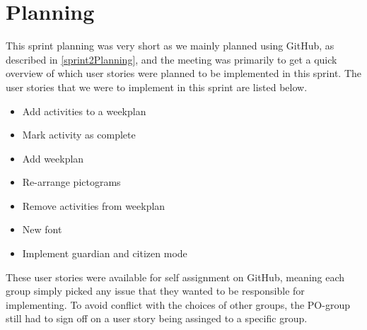 \section{Planning}
This sprint planning was very short as we mainly planned using GitHub, as described in \autoref{sprint2Planning}, and the meeting was primarily to get a quick overview of which user stories were planned to be implemented in this sprint.
The user stories that we were to implement in this sprint are listed below.

\begin{itemize}
\item Add activities to a weekplan
\item Mark activity as complete
\item Add weekplan
\item Re-arrange pictograms
\item Remove activities from weekplan
\item New font
\item Implement guardian and citizen mode
\end{itemize}

These user stories were available for self assignment on GitHub, meaning each group simply picked any issue that they wanted to be responsible for implementing.
To avoid conflict with the choices of other groups, the PO-group still had to sign off on a user story being assinged to a specific group.
